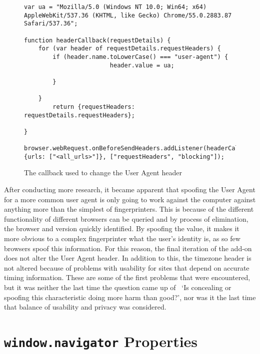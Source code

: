 \begin{figure}
\begin{lstlisting}
var ua = "Mozilla/5.0 (Windows NT 10.0; Win64; x64) AppleWebKit/537.36 (KHTML, like Gecko) Chrome/55.0.2883.87 Safari/537.36";

function headerCallback(requestDetails) {
    for (var header of requestDetails.requestHeaders) {
        if (header.name.toLowerCase() === "user-agent") {
                        header.value = ua;
                                
        }
            
    }
        return {requestHeaders: requestDetails.requestHeaders};

}

browser.webRequest.onBeforeSendHeaders.addListener(headerCallback, {urls: ["<all_urls>"]}, ["requestHeaders", "blocking"]);
\end{lstlisting}
\caption{The callback used to change the User Agent header}
\label{fig:user-agent-lst}
\end{figure}

After conducting more research, it became apparent that spoofing the User Agent for a more common user agent is only going to work against the computer against anything more than the simplest of fingerprinters.
This is because of the different functionality of different browsers can be queried and by process of elimination, the browser and version quickly identified.
By spoofing the value, it makes it more obvious to a complex fingerprinter what the user's identity is, as so few browsers spoof this information.
For this reason, the final iteration of the add-on does not alter the User Agent header.
In addition to this, the timezone header is not altered because of problems with usability for sites that depend on accurate timing information.
These are some of the first problems that were encountered, but it was neither the last time the question came up of ~`Is concealing or spoofing this characteristic doing more harm than good?', nor was it the last time that balance of usability and privacy was considered.

\section{\texttt{window.navigator} Properties}

